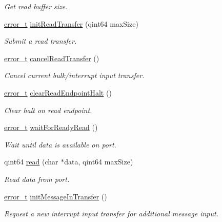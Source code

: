 \begin{DoxyCompactItemize}
\begin{DoxyCompactList}\small\item\em Get read buffer size. \end{DoxyCompactList}\item 
\hyperlink{classmdt_abstract_port_ad4121bb930c95887e77f8bafa065a85e}{error\-\_\-t} \hyperlink{classmdt_usb_port_a5e380852b8726f71e8558c86cba5bd1f}{init\-Read\-Transfer} (qint64 max\-Size)
\begin{DoxyCompactList}\small\item\em Submit a read transfer. \end{DoxyCompactList}\item 
\hyperlink{classmdt_abstract_port_ad4121bb930c95887e77f8bafa065a85e}{error\-\_\-t} \hyperlink{classmdt_usb_port_a3570b708f9f51408e4bbf2f61cc8c881}{cancel\-Read\-Transfer} ()
\begin{DoxyCompactList}\small\item\em Cancel current bulk/interrupt input transfer. \end{DoxyCompactList}\item 
\hyperlink{classmdt_abstract_port_ad4121bb930c95887e77f8bafa065a85e}{error\-\_\-t} \hyperlink{classmdt_usb_port_af940b6fe25e874ff0746686bc30c4f2c}{clear\-Read\-Endpoint\-Halt} ()
\begin{DoxyCompactList}\small\item\em Clear halt on read endpoint. \end{DoxyCompactList}\item 
\hyperlink{classmdt_abstract_port_ad4121bb930c95887e77f8bafa065a85e}{error\-\_\-t} \hyperlink{classmdt_usb_port_ab8ddd4ebee603ac381e8da0383a61e36}{wait\-For\-Ready\-Read} ()
\begin{DoxyCompactList}\small\item\em Wait until data is available on port. \end{DoxyCompactList}\item 
qint64 \hyperlink{classmdt_usb_port_abce257345c8af47494215cd7ee75f82d}{read} (char $\ast$data, qint64 max\-Size)
\begin{DoxyCompactList}\small\item\em Read data from port. \end{DoxyCompactList}\item 
\hyperlink{classmdt_abstract_port_ad4121bb930c95887e77f8bafa065a85e}{error\-\_\-t} \hyperlink{classmdt_usb_port_a897234cc2c7561da323cb124f57bcc28}{init\-Message\-In\-Transfer} ()
\begin{DoxyCompactList}\small\item\em Request a new interrupt input transfer for additional message input. \end{DoxyCompactList}\item 

\end{DoxyCompactItemize}
